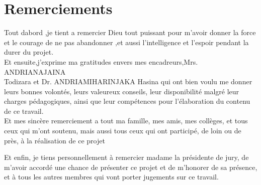 \chapter*{Remerciements}



{\setlength{\baselineskip}{1.5\baselineskip}
Tout dabord ,je tient a remercier Dieu tout puissant pour m'avoir donner la force et le courage de ne pas abandonner ,et aussi l'intelligence et l'espoir pendant la durer du projet.\\

Et ensuite,j’exprime ma gratitudes envers mes encadreurs,Mrs. ANDRIANAJAINA \\ Todizara et Dr. ANDRIAMIHARINJAKA Hasina qui ont bien voulu me donner leurs bonnes volontés, leurs valeureux conseils, leur disponibilité malgré leur charges pédagogiques, ainsi que leur compétences pour l’élaboration du contenu de ce travail.\\

Et mes sincère remerciement a tout ma famille, mes amis, mes collèges, et tous ceux qui
m’ont soutenu, mais aussi tous ceux qui ont participé, de loin ou de près, à la réalisation de ce
projet

Et enfin, je tiens personnellement à remercier madame la présidente de jury, de m’avoir accordé une chance de présenter ce projet et de m’honorer de sa présence, et à tous les autres membres qui vont porter jugements sur ce travail.





\par}


